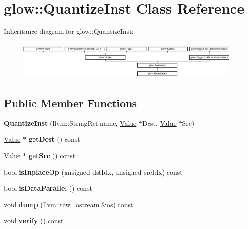 \hypertarget{classglow_1_1_quantize_inst}{}\section{glow\+:\+:Quantize\+Inst Class Reference}
\label{classglow_1_1_quantize_inst}
Inheritance diagram for glow\+:\+:Quantize\+Inst\+:\begin{figure}[H]
\begin{center}
\leavevmode
\includegraphics[height=1.991111cm]{classglow_1_1_quantize_inst}
\end{center}
\end{figure}
\subsection*{Public Member Functions}
\begin{DoxyCompactItemize}
\item 
\mbox{\label{classglow_1_1_quantize_inst_ab586458968d5baffe79b1e3e522bae74}} 
{\bfseries Quantize\+Inst} (llvm\+::\+String\+Ref name, \hyperlink{classglow_1_1_value}{Value} $\ast$Dest, \hyperlink{classglow_1_1_value}{Value} $\ast$Src)
\item 
\mbox{\label{classglow_1_1_quantize_inst_abaa3c346a2ee8de78850077ef3a0ff6b}} 
\hyperlink{classglow_1_1_value}{Value} $\ast$ {\bfseries get\+Dest} () const
\item 
\mbox{\label{classglow_1_1_quantize_inst_a498c755c534d9a82706f5fbe16942907}} 
\hyperlink{classglow_1_1_value}{Value} $\ast$ {\bfseries get\+Src} () const
\item 
\mbox{\label{classglow_1_1_quantize_inst_a0a31f2b8790665206592047fa7ee0a5d}} 
bool {\bfseries is\+Inplace\+Op} (unsigned dst\+Idx, unsigned src\+Idx) const
\item 
\mbox{\label{classglow_1_1_quantize_inst_a1339f1bdc6eaa618a4d71d404f14efa7}} 
bool {\bfseries is\+Data\+Parallel} () const
\item 
\mbox{\label{classglow_1_1_quantize_inst_a712c64fd917eb9af921f6f590073ac27}} 
void {\bfseries dump} (llvm\+::raw\+\_\+ostream \&os) const
\item 
\mbox{\label{classglow_1_1_quantize_inst_ae10ffcab209fa8c6f9596b17e6fd5e4a}} 
void {\bfseries verify} () const
\end{DoxyCompactItemize}
